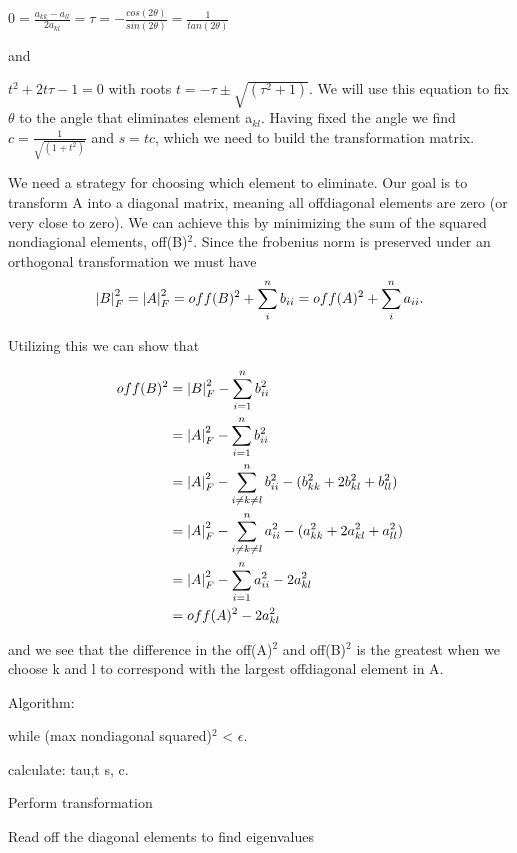 $0 = \frac{a_{kk} - a_{ll}}{2a_{kl}} = \tau = -\frac{cos(2\theta)}{sin(2\theta)} = \frac{1}{tan(2\theta)}$

and

$t^2 + 2t\tau -1 = 0$ with roots $t = -\tau \pm \sqrt{(\tau^2 + 1)}$. We will
use this equation to fix $\theta$ to the angle that eliminates element a$_{kl}$.
Having fixed the angle we find $c = \frac{1}{\sqrt{(1+t^2)}}$ and $s = tc$, which
we need to build the transformation matrix.

We need a strategy for choosing which element to eliminate. Our goal is to
transform A into a diagonal matrix, meaning all offdiagonal elements are zero
(or very close to zero). We can achieve this by minimizing the sum of the
squared nondiagional elements, off(B)$^2$. Since the frobenius norm is
preserved under an orthogonal transformation we must have
$$ \abs{B}_F^2 = \abs{A}_F^2 =  off(B)^2 + \sum_{i}^{n} b_{ii} = off(A)^2 + \sum_{i}^{n} a_{ii}.$$

Utilizing this we can show that

\begin{align*}
  off(B)^2 &= \abs{B}_F^2 - \sum_{i=1}^{n} b_{ii}^2 \\
  &= \abs{A}_F^2 - \sum_{i=1}^{n} b_{ii}^2 \\
  &= \abs{A}_F^2 - \sum_{i \neq k \neq l}^{n} b_{ii}^2 - (b_{kk}^2 + 2b_{kl}^2 + b_{ll}^2) \\
  &= \abs{A}_F^2 - \sum_{i\neq k \neq l}^{n} a_{ii}^2 - (a_{kk}^2 + 2a_{kl}^2 + a_{ll}^2) \\
  &= \abs{A}_F^2 - \sum_{i=1}^{n} a_{ii}^2 - 2a_{kl}^2 \\
  &= off(A)^2 - 2a_{kl}^2
\end{align*}

and we see that the difference in the off(A)$^2$ and off(B)$^2$ is the greatest
when we choose k and l to correspond with the largest offdiagonal element in A.




Algorithm:

while (max nondiagonal squared)$^2$ < $\epsilon$.

  calculate: tau,t s, c.

  Perform transformation

Read off the diagonal elements to find eigenvalues
